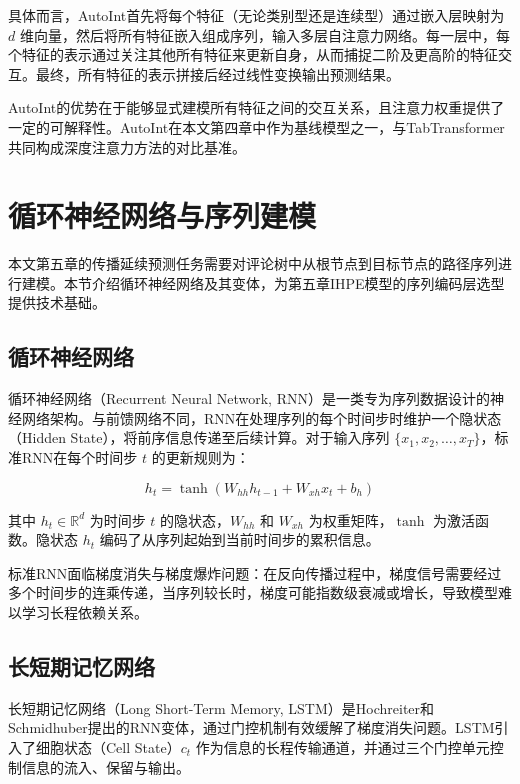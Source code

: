 具体而言，AutoInt首先将每个特征（无论类别型还是连续型）通过嵌入层映射为 $d$ 维向量，然后将所有特征嵌入组成序列，输入多层自注意力网络。每一层中，每个特征的表示通过关注其他所有特征来更新自身，从而捕捉二阶及更高阶的特征交互。最终，所有特征的表示拼接后经过线性变换输出预测结果。

AutoInt的优势在于能够显式建模所有特征之间的交互关系，且注意力权重提供了一定的可解释性。AutoInt在本文第四章中作为基线模型之一，与TabTransformer共同构成深度注意力方法的对比基准。

\section{循环神经网络与序列建模}

本文第五章的传播延续预测任务需要对评论树中从根节点到目标节点的路径序列进行建模。本节介绍循环神经网络及其变体，为第五章IHPE模型的序列编码层选型提供技术基础。

\subsection{循环神经网络}

循环神经网络（Recurrent Neural Network, RNN）是一类专为序列数据设计的神经网络架构\cite{elman1990finding}。与前馈网络不同，RNN在处理序列的每个时间步时维护一个隐状态（Hidden State），将前序信息传递至后续计算。对于输入序列 $\{x_1, x_2, \ldots, x_T\}$，标准RNN在每个时间步 $t$ 的更新规则为：

\begin{equation}
h_t = \tanh(W_{hh} h_{t-1} + W_{xh} x_t + b_h)
\end{equation}

其中 $h_t \in \mathbb{R}^d$ 为时间步 $t$ 的隐状态，$W_{hh}$ 和 $W_{xh}$ 为权重矩阵，$\tanh$ 为激活函数。隐状态 $h_t$ 编码了从序列起始到当前时间步的累积信息。

标准RNN面临梯度消失与梯度爆炸问题\cite{bengio1994learning}：在反向传播过程中，梯度信号需要经过多个时间步的连乘传递，当序列较长时，梯度可能指数级衰减或增长，导致模型难以学习长程依赖关系。

\subsection{长短期记忆网络}

长短期记忆网络（Long Short-Term Memory, LSTM）是Hochreiter和Schmidhuber\cite{hochreiter1997long}提出的RNN变体，通过门控机制有效缓解了梯度消失问题。LSTM引入了细胞状态（Cell State）$c_t$ 作为信息的长程传输通道，并通过三个门控单元控制信息的流入、保留与输出。

